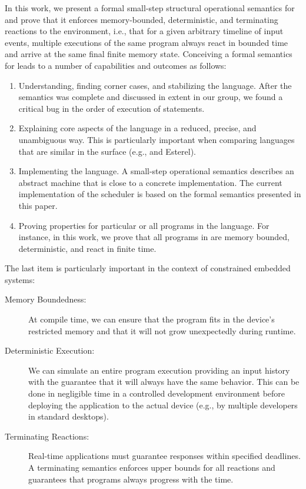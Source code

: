 In this work, we present a formal small-step structural operational
semantics for \CEU and prove that it enforces memory-bounded, deterministic,
and terminating reactions to the environment, i.e., that for a given
arbitrary timeline of input events, multiple executions of the same program
always react in bounded time and arrive at the same final finite memory
state.
%
Conceiving a formal semantics for \CEU leads to a number of capabilities and
outcomes as follows:

\begin{enumerate}
\item
    Understanding, finding corner cases, and stabilizing the language.
    After the semantics was complete and discussed in extent in our group, we
    found a critical bug in the order of execution of statements.
\item
    Explaining core aspects of the language in a reduced, precise, and
    unambiguous way.
    This is particularly important when comparing languages that are similar in
    the surface (e.g., \CEU and Esterel).
\item
    Implementing the language.
    A small-step operational semantics describes an abstract machine that is
    close to a concrete implementation.
    The current implementation of the \CEU scheduler is based on the formal
    semantics presented in this paper.
\item
    Proving properties for particular or all programs in the language.
    For instance, in this work, we prove that all programs in \CEU are memory
    bounded, deterministic, and react in finite time.
\end{enumerate}

The last item is particularly important in the context of constrained embedded
systems:

\begin{description}
\item[Memory Boundedness:]
At compile time, we can ensure that the program fits in the device's restricted
memory and that it will not grow unexpectedly during runtime.
\item[Deterministic Execution:]
We can simulate an entire program execution providing an input history with the
guarantee that it will always have the same behavior.
This can be done in negligible time in a controlled development environment
before deploying the application to the actual device (e.g., by multiple
developers in standard desktops).
\item[Terminating Reactions:]
Real-time applications must guarantee responses within specified deadlines.
A terminating semantics enforces upper bounds for all reactions and guarantees
that programs always progress with the time.
\end{description}
